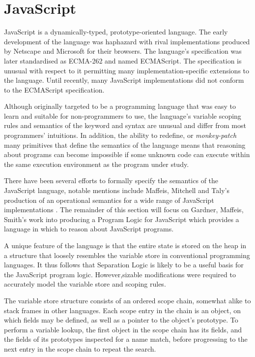 \documentclass[a4paper]{report}
\begin{document}
\section{JavaScript}

  JavaScript is a dynamically-typed, prototype-oriented language. The
  early development of the language was haphazard with rival implementations
  produced by Netscape and Microsoft for their browsers. The language's
  specification was later standardised as ECMA-262 and named ECMAScript.
  The specification is unusual with respect to it permitting many
  implementation-specific extensions to the language. Until recently, many
  JavaScript implementations did not conform to the ECMAScript specification.

  Although originally targeted to be a programming language that was easy to
  learn and suitable for non-programmers to use, the language's variable scoping
  rules and semantics of the  keyword and  syntax are unusual
  and differ from most programmers' intuitions. In addition, the ability to
  redefine, or \emph{monkey-patch} many primitives that define the semantics of
  the language means that reasoning about programs can become impossible if
  some unknown code can execute within the same execution environment as the
  program under study.

  There have been several efforts to formally specify the semantics of the
  JavaScript language, notable mentions include Maffeis, Mitchell and Taly's
  production of an operational semantics for a wide range of JavaScript
  implementations \cite{maffeis-jsopsem}. The remainder of this section will
  focus on Gardner, Maffeis, Smith's work \cite{gms-popl} into producing a
  Program Logic for JavaScript which provides a language in which to reason
  about JavaScript programs.

  A unique feature of the
  language is that the entire state is stored on the heap in a structure that
  loosely resembles the variable store in conventional programming languages. It
  thus follows that Separation Logic is likely to be a useful basis for the
  JavaScript program logic. However,sizable modifications were required to
  accurately model the variable store and scoping rules.


  The variable store structure consists of an ordered scope chain,
  somewhat alike to
  stack frames in other languages. Each scope entry in the chain is an object,
  on which fields may be defined, as well as a pointer to the object's
  prototype. To perform a variable lookup, the first object in the scope chain has
  its fields, and the fields of its prototypes inspected for a name match, before
  progressing to the next entry in the scope chain to repeat the search.
\end{document}
